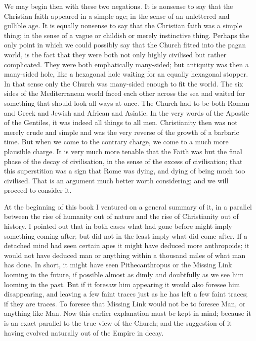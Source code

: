 We may begin then with these two negations. It is nonsense to say that the Christian faith appeared in a simple age; in the sense of an unlettered and gullible age. It is equally nonsense to say that the Christian faith was a simple thing; in the sense of a vague or childish or merely instinctive thing. Perhaps the only point in which we could possibly say that the Church fitted into the pagan world, is the fact that they were both not only highly civilised but rather complicated. They were both emphatically many-sided; but antiquity was then a many-sided hole, like a hexagonal hole waiting for an equally hexagonal stopper. In that sense only the Church was many-sided enough to fit the world. The six sides of the Mediterranean world faced each other across the sea and waited for something that should look all ways at once. The Church had to be both Roman and Greek and Jewish and African and Asiatic. In the very words of the Apostle of the Gentiles, it was indeed all things to all men. Christianity then was not merely crude and simple and was the very reverse of the growth of a barbaric time. But when we come to the contrary charge, we come to a much more plausible charge. It is very much more tenable that the Faith was but the final phase of the decay of civilisation, in the sense of the excess of civilisation; that this superstition was a sign that Rome was dying, and dying of being much too civilised. That is an argument much better worth considering; and we will proceed to consider it.

At the beginning of this book I ventured on a general summary of it, in a parallel between the rise of humanity out of nature and the rise of Christianity out of history. I pointed out that in both cases what had gone before might imply something coming after; but did not in the least imply what did come after. If a detached mind had seen certain apes it might have deduced more anthropoids; it would not have deduced man or anything within a thousand miles of what man has done. In short, it might have seen Pithecanthropus or the Missing Link looming in the future, if possible almost as dimly and doubtfully as we see him looming in the past. But if it foresaw him appearing it would also foresee him disappearing, and leaving a few faint traces just as he has left a few faint traces; if they are traces. To foresee that Missing Link would not be to foresee Man, or anything like Man. Now this earlier explanation must be kept in mind; because it is an exact parallel to the true view of the Church; and the suggestion of it having evolved naturally out of the Empire in decay.

